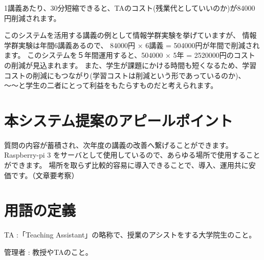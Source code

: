\documentclass[a4j,titlepage]{ujarticle}
\begin{document}
1講義あたり、30分短縮できると、TAのコスト(残業代としていいのか)が84000円削減されます。


このシステムを活用する講義の例として情報学群実験を挙げていますが、
情報学群実験は年間6講義あるので、 84000円 × 6講義 = 504000円が年間で削減されます。
このシステムを５年間運用すると、504000 × 5年 = 2520000円のコストの削減が見込まれます。
また、学生が課題にかける時間も短くなるため、学習コストの削減にもつながり(学習コストは削減という形であっているのか)、
〜〜と学生の二者にとって利益をもたらすものだと考えられます。

\section{本システム提案のアピールポイント}
質問の内容が蓄積され、次年度の講義の改善へ繋げることができます。
Raspberry-pi 3 をサーバとして使用しているので、あらゆる場所で使用することができます。
場所を取らず比較的容易に導入できることで、導入、運用共に安価です。（文章要考察）


\section{用語の定義}
TA :「Teaching Assistant」の略称で、授業のアシストをする大学院生のこと。

管理者 : 教授やTAのこと。




\newpage
\end{document}

